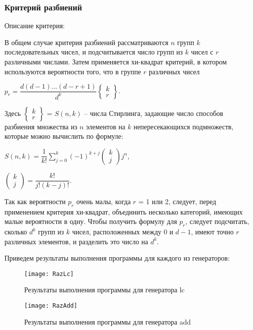 \documentclass[bachelor, och, coursework]{shiza}
\begin{document}
	\subsubsection{Критерий разбиений}
	
	Описание критерия:
	
	В общем случае критерия разбиений рассматриваются $n$ групп $k$ последовательных чисел, и подсчитывается число групп из $k$ чисел с $r$ различными числами. Затем применяется хи-квадрат критерий, в котором используются вероятности того, что в группе $r$ различных чисел
			\begin{center}
				$p_r = \dfrac{d (d - 1) \dots (d - r + 1)}{d^k} \left\{ \substack{k\\r} \right\}$.
			\end{center}
	
	Здесь $\left\{ \substack{k\\r} \right\}$ = $S(n, k)$ – числа Стирлинга, задающие число способов разбиения множества из $n$ элементов на $k$ непересекающихся подмножеств, которые можно вычислить по формуле:
				\begin{center}
					$S(n, k) = \dfrac{1}{k!} \sum_{j = 0}^{k} (-1)^{k + j} \left( \substack{k\\j} \right) j^n$,
					
					$\left( \substack{k\\j} \right) = \dfrac{k!}{j! (k - j)!}$.
				\end{center}

	Так как вероятности $p_r$ очень малы, когда $r$ = 1 или 2, следует, перед применением критерия хи-квадрат, объединить несколько категорий, имеющих малые вероятности в одну.
	Чтобы получить формулу для $p_r$, следует подсчитать, сколько  $d^k$ групп из $k$ чисел, расположенных между $0$ и $d - 1$, имеют точно $r$ различных элементов, и разделить это число на $d^k$. 
	
	Приведем результаты выполнения программы для каждого из генераторов:
	
	\begin{figure}[H]
		\centering
		\texttt{[image: RazLc]}
		\caption{Результаты выполнения программы для генератора lc}
		\label{fig:RazLc}
	\end{figure}
	
	\begin{figure}[H]
		\centering
		\texttt{[image: RazAdd]}
		\caption{Результаты выполнения программы для генератора add}
		\label{fig:RazAdd}
	\end{figure}
	
\end{document}

